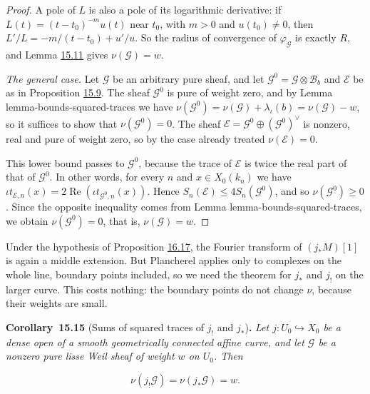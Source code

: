 \documentclass[11pt]{article}
\newenvironment{bpstatement}[2]{\par\addvspace{0.6\baselineskip}\noindent\textbf{#1}#2\textbf{.}\enspace\ignorespaces}
  {\par\addvspace{0.4\baselineskip}}
\newenvironment{bpstatementit}[2]{\begin{bpstatement}{#1}{#2}\itshape\ignorespaces}{\end{bpstatement}}
\begin{document}
\begin{proof}[{Proof}]
A pole of \(L\) is also a pole of its logarithmic derivative: if \(L(t)=(t-t_0)^{-m}u(t)\) near \(t_0\), with \(m>0\) and \(u(t_0)\ne0\), then \(L'/L=-m/(t-t_0)+u'/u\). So the radius of convergence of \(\varphi_{\mathcal G}\) is exactly \(R\), and Lemma \hyperref[bp153]{15.11} gives \(\nu(\mathcal G)=w\).

\emph{The general case.} Let \(\mathcal G\) be an arbitrary pure sheaf, and let \(\mathcal G^0=\mathcal G\otimes\mathcal B_b\) and \(\mathcal E\) be as in Proposition \hyperref[bp148]{15.9}. The sheaf \(\mathcal G^0\) is pure of weight zero, and by Lemma lemma-bounds-squared-traces we have \(\nu(\mathcal G^0)=\nu(\mathcal G)+\lambda_\iota(b)=\nu(\mathcal G)-w\), so it suffices to show that \(\nu(\mathcal G^0)=0\). The sheaf \(\mathcal E=\mathcal G^0\oplus(\mathcal G^0)^\vee\) is nonzero, real and pure of weight zero, so by the case already treated \(\nu(\mathcal E)=0\).

This lower bound passes to \(\mathcal G^0\), because the trace of \(\mathcal E\) is twice the real part of that of \(\mathcal G^0\). In other words, for every \(n\) and \(x\in X_0(k_n)\) we have \(\iota t_{\mathcal E,n}(x)=2\operatorname{Re}(\iota t_{\mathcal G^0,n}(x))\). Hence \(S_n(\mathcal E)\le4S_n(\mathcal G^0)\), and so \(\nu(\mathcal G^0)\ge0\). Since the opposite inequality comes from Lemma lemma-bounds-squared-traces, we obtain \(\nu(\mathcal G^0)=0\), that is, \(\nu(\mathcal G)=w\).
\end{proof}

\label{bp164}%
Under the hypothesis of Proposition \hyperref[bp218]{16.17}, the Fourier transform of \((j_*M)[1]\) is again a middle extension. But Plancherel applies only to complexes on the whole line, boundary points included, so we need the theorem for \(j_*\) and \(j_!\) on the larger curve. This costs nothing: the boundary points do not change \(\nu\), because their weights are small.

\label{bp165}%
\begin{bpstatementit}{Corollary~15.15}{ (Sums of squared traces of $j_!$ and $j_*$)}
Let \(j:U_0\hookrightarrow X_0\) be a dense open of a smooth geometrically connected affine curve, and let \(\mathcal G\) be a nonzero pure lisse Weil sheaf of weight \(w\) on \(U_0\). Then

\[
\nu(j_!\mathcal G)=\nu(j_*\mathcal G)=w.
\]
\end{bpstatementit}
\end{document}
